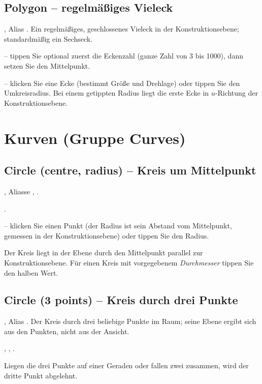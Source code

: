 \subsection{Polygon -- regelmäßiges Vieleck}\label{sec:cmd-polygon}
, Alias . Ein regelmäßiges, geschlossenes Vieleck in der
Konstruktionsebene; standardmäßig ein Sechseck.
\begin{schritte}
\item {} -- tippen Sie
  optional zuerst die Eckenzahl (ganze Zahl von 3 bis 1000), dann setzen Sie den Mittelpunkt.
\item {} -- klicken Sie eine Ecke (bestimmt Größe
  und Drehlage) oder tippen Sie den Umkreisradius. Bei einem getippten Radius liegt die erste
  Ecke in $u$-Richtung der Konstruktionsebene.
\end{schritte}

\section{Kurven (Gruppe Curves)}\label{sec:gruppe-curves}

\subsection{Circle (centre, radius) -- Kreis um Mittelpunkt}\label{sec:cmd-circle}
, Aliasse , .
\begin{schritte}
\item {}.
\item {} -- klicken Sie einen Punkt (der Radius ist sein
  Abstand vom Mittelpunkt, gemessen in der Konstruktionsebene) oder tippen Sie den Radius.
\end{schritte}
Der Kreis liegt in der Ebene durch den Mittelpunkt parallel zur Konstruktionsebene. Für einen
Kreis mit vorgegebenem \emph{Durchmesser} tippen Sie den halben Wert.

\subsection{Circle (3 points) -- Kreis durch drei Punkte}\label{sec:cmd-circle3p}
, Alias . Der Kreis durch drei beliebige Punkte im Raum; seine Ebene
ergibt sich aus den Punkten, nicht aus der Ansicht.
\begin{schritte}
\item {}, , .
\end{schritte}
Liegen die drei Punkte auf einer Geraden oder fallen zwei zusammen, wird der dritte Punkt
abgelehnt.


